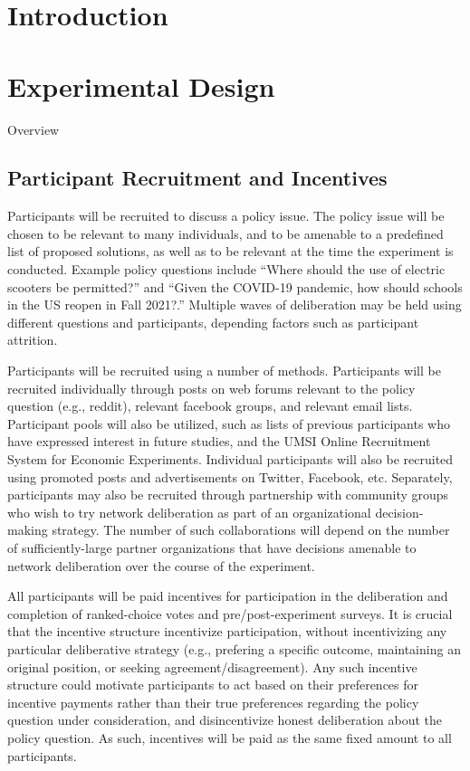 \section{Introduction}

\section{Experimental Design}
Overview

\subsection{Participant Recruitment and Incentives}
Participants will be recruited to discuss a policy issue.
The policy issue will be chosen to be relevant to many individuals,
and to be amenable to a predefined list of proposed solutions,
as well as to be relevant at the time the experiment is conducted.
Example policy questions include
``Where should the use of electric scooters be permitted?'' and
``Given the COVID-19 pandemic, how should schools in the US reopen in Fall 2021?.''
Multiple waves of deliberation may be held using different questions and participants,
depending factors such as participant attrition.

Participants will be recruited using a number of methods.
Participants will be recruited individually through posts on web forums
relevant to the policy question (e.g., reddit),
relevant facebook groups,
and relevant email lists.
Participant pools will also be utilized,
such as lists of previous participants who have expressed interest in future
studies,
and the UMSI Online Recruitment System for Economic Experiments.
Individual participants will also be recruited using promoted posts and
advertisements on Twitter, Facebook, etc.
Separately, participants may also be recruited through partnership with
community groups who wish to try network deliberation as part of an organizational
decision-making strategy.
The number of such collaborations will depend on the number of sufficiently-large
partner organizations that have decisions amenable to network deliberation
over the course of the experiment.

All participants will be paid incentives for participation in the deliberation
and completion of ranked-choice votes and pre/post-experiment surveys.
It is crucial that the incentive structure incentivize participation,
without incentivizing any particular deliberative strategy
(e.g., prefering a specific outcome, maintaining an original position, or
seeking agreement/disagreement).
Any such incentive structure could motivate participants to act based on their
preferences for incentive payments rather than their true preferences regarding
the policy question under consideration,
and disincentivize honest deliberation about the policy question.
As such, incentives will be paid as the same fixed amount to all participants.


